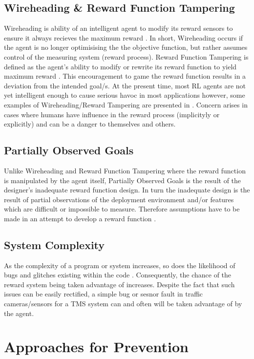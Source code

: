 \subsection{Wireheading \& Reward Function Tampering}
Wireheading is ability of an intelligent agent to modify its reward sensors to ensure it always recieves the maximum reward \cite{Wireheading} \cite{Amodei}. 
In short, Wireheading occurs if the agent is no longer optimisising the the objective function, but rather assumes control of the measuring system (reward process).
Reward Function Tampering is defined as the agent's ability to modify or rewrite its reward function to yield maximum reward \cite{DBLP:journals/corr/abs-1908-04734}.
This encouragement to game the reward function results in a deviation from the intended goal/s. 
At the present time, most RL agents are not yet intelligent enough to cause serious havoc in most applications however, some examples of Wireheading/Reward Tampering are presented in \cite{DBLP:journals/corr/abs-1908-04734}.  
Concern arises in cases where humans have influence in the reward process (implicityly or explicitly) and can be a danger to themselves and others.

\subsection{Partially Observed Goals}
Unlike Wireheading and Reward Function Tampering where the reward function is manipulated by the agent itself,
Partially Observed Goals is the result of the designer's inadequate reward function design.
In turn the inadequate design is the result of partial observations of the deployment environment and/or features which are difficult or impossible to measure.
Therefore assumptions have to be made in an attempt to develop a reward function \cite{Amodei}.

\subsection{System Complexity}
As the complexity of a program or system increases, so does the likelihood of bugs and glitches existing within the code \cite{Amodei}.
Consequently, the chance of the reward system being taken advantage of increases. 
Despite the fact that such issues can be easily rectified, a simple bug or sesnor fault in traffic cameras/sensors  for a TMS system can and often will be taken advantage of by the agent. 


\section{Approaches for Prevention}
